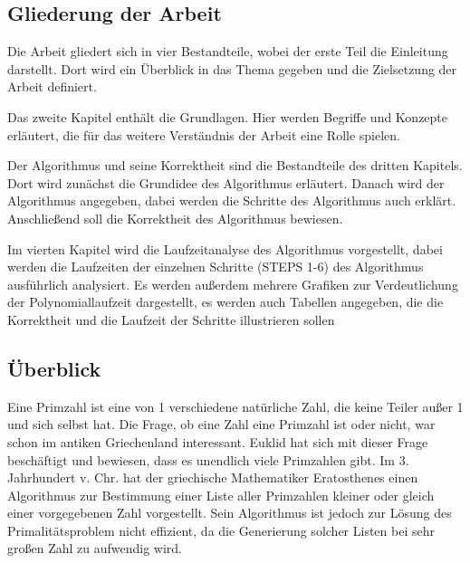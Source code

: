 \documentclass[12pt,oneside]{article}
\theoremstyle{remark}
\theoremstyle{definition}
\begin{document}
\subsection{Gliederung der Arbeit}
Die Arbeit gliedert sich in vier Bestandteile, wobei der
erste Teil die Einleitung darstellt. Dort wird ein Überblick in das Thema gegeben und die Zielsetzung der Arbeit definiert.

Das zweite Kapitel enthält die Grundlagen. Hier werden Begriffe und Konzepte erläutert, die für das weitere Verständnis der Arbeit eine Rolle spielen. 

Der Algorithmus und seine Korrektheit sind die Bestandteile des dritten Kapitels. Dort wird zunächst die Grundidee des Algorithmus erläutert. Danach wird der Algorithmus angegeben, dabei werden die Schritte des Algorithmus auch erklärt. Anschließend soll die Korrektheit des Algorithmus bewiesen. 

Im vierten Kapitel wird die Laufzeitanalyse des Algorithmus vorgestellt, dabei werden die Laufzeiten der einzelnen Schritte (STEPS 1-6) des Algorithmus ausführlich analysiert. Es werden außerdem mehrere Grafiken zur Verdeutlichung der Polynomiallaufzeit dargestellt, es werden auch Tabellen angegeben, die die Korrektheit und die Laufzeit der Schritte illustrieren sollen        

\subsection{Überblick}
Eine Primzahl ist eine von 1 verschiedene natürliche Zahl, die keine Teiler außer 1 und sich selbst hat. Die Frage, ob eine Zahl eine Primzahl ist oder nicht, war schon im antiken Griechenland interessant. Euklid hat sich mit dieser Frage beschäftigt und bewiesen, dass es unendlich viele Primzahlen gibt. Im 3. Jahrhundert v. Chr. hat der griechische Mathematiker Eratosthenes einen Algorithmus zur Bestimmung einer Liste aller Primzahlen kleiner oder gleich einer vorgegebenen Zahl vorgestellt. Sein Algorithmus ist jedoch zur Lösung des Primalitätsproblem nicht effizient, da die Generierung solcher Listen bei sehr großen Zahl zu aufwendig wird.
\end{document}
